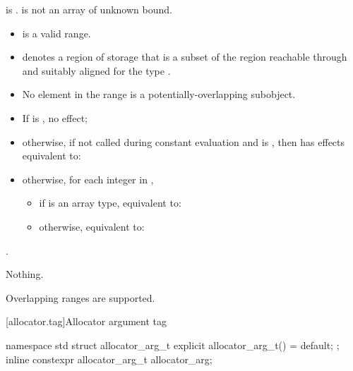 \begin{itemdescr}
\pnum
\mandates
{} is .
 is not an array of unknown bound.

\pnum
\expects
\begin{itemize}
\item
   is a valid range.
\item
   denotes a region of storage that is
  a subset of the region reachable through 
  and suitably aligned for the type .
\item
  No element in the range  is a potentially-overlapping
  subobject.
\end{itemize}

\pnum
\effects
\begin{itemize}
\item
  If  is , no effect;
\item
  otherwise, if not called during constant evaluation and
   is , then has
  effects equivalent to: 
\item
  otherwise, for each integer  in  ,
  \begin{itemize}
  \item
    if  is an array type, equivalent to:
  \item
    otherwise, equivalent to:
  \end{itemize}
\end{itemize}

\pnum
\returns
{}.

\pnum
\throws
Nothing.

\begin{note}
Overlapping ranges are supported.
\end{note}
\end{itemdescr}

[allocator.tag]{Allocator argument tag}

%
%
\begin{itemdecl}
namespace std {
  struct allocator_arg_t { explicit allocator_arg_t() = default; };
  inline constexpr allocator_arg_t allocator_arg{};
}
\end{itemdecl}


